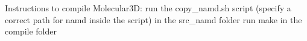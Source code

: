 Instructions to compile Molecular3D:
run the copy_namd.sh script (specify a correct path for namd inside the script) in the src_namd folder
run make in the compile folder
